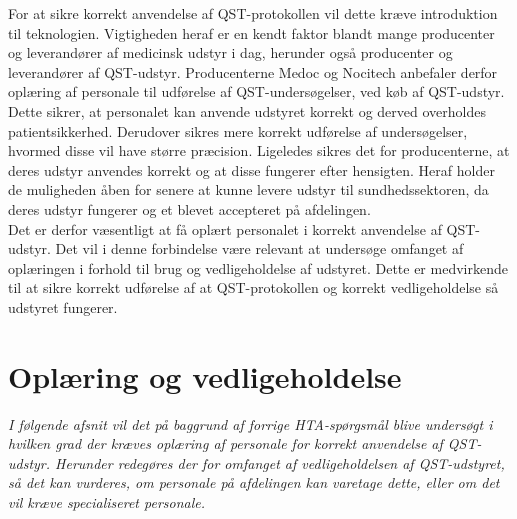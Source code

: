 For at sikre korrekt anvendelse af QST-protokollen vil dette kræve introduktion til teknologien. Vigtigheden heraf er en kendt faktor blandt mange producenter og leverandører af medicinsk udstyr i dag, herunder også producenter og leverandører af QST-udstyr. Producenterne Medoc og Nocitech anbefaler derfor oplæring af personale til udførelse af QST-undersøgelser, ved køb af QST-udstyr. Dette sikrer, at personalet kan anvende udstyret korrekt og derved overholdes patientsikkerhed. Derudover sikres mere korrekt udførelse af undersøgelser, hvormed disse vil have større præcision. Ligeledes sikres det for producenterne, at deres udstyr anvendes korrekt og at disse fungerer efter hensigten. Heraf holder de muligheden åben for senere at kunne levere udstyr til sundhedssektoren, da deres udstyr fungerer og et blevet accepteret på afdelingen. \\
Det er derfor væsentligt at få oplært personalet i korrekt anvendelse af QST-udstyr. Det vil i denne forbindelse være relevant at undersøge omfanget af oplæringen i forhold til brug og vedligeholdelse af udstyret. Dette er medvirkende til at sikre korrekt udførelse af at QST-protokollen og korrekt vedligeholdelse så udstyret fungerer.

\section{Oplæring og vedligeholdelse}
\textit{I følgende afsnit vil det på baggrund af forrige HTA-spørgsmål blive undersøgt i hvilken grad der kræves oplæring af personale for korrekt anvendelse af QST-udstyr. Herunder redegøres der for omfanget af vedligeholdelsen af QST-udstyret, så det kan vurderes, om personale på afdelingen kan varetage dette, eller om det vil kræve specialiseret personale.}

